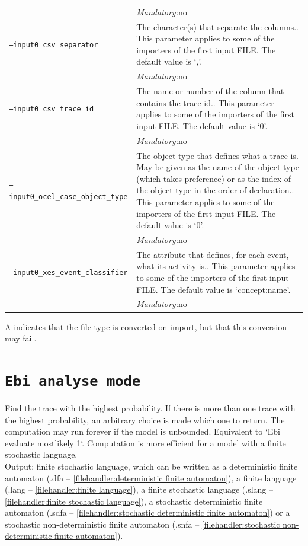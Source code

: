 {\begin{tabularx}{\linewidth}{lX}
&\textit{Mandatory:}\quad no\\
\texttt{--input0\_csv\_separator} & The character(s) that separate the columns.. This parameter applies to some of the importers of the first input FILE. The default value is `,'.\\
&\textit{Mandatory:}\quad no\\
\texttt{--input0\_csv\_trace\_id} & The name or number of the column that contains the trace id.. This parameter applies to some of the importers of the first input FILE. The default value is `0'.\\
&\textit{Mandatory:}\quad no\\
\texttt{--input0\_ocel\_case\_object\_type} & The object type that defines what a trace is. May be given as the name of the object type (which takes preference) or as the index of the object-type in the order of declaration.. This parameter applies to some of the importers of the first input FILE. The default value is `0'.\\
&\textit{Mandatory:}\quad no\\
\texttt{--input0\_xes\_event\_classifier} & The attribute that defines, for each event, what its activity is.. This parameter applies to some of the importers of the first input FILE. The default value is `concept:name'.\\
&\textit{Mandatory:}\quad no\\
\bottomrule
\end{tabularx}
A \textdagger{} indicates that the file type is converted on import, but that this conversion may fail.
\clearpage\section{\texttt{Ebi analyse mode}}
\label{command:Ebi analyse mode}
Find the trace with the highest probability.
If there is more than one trace with the highest probability, an arbitrary choice is made which one to return.
The computation may run forever if the model is unbounded.
Equivalent to `Ebi evaluate mostlikely 1`.
Computation is more efficient for a model with a finite stochastic language.\\
\noindent Output: finite stochastic language, which can be written as a deterministic finite automaton (.dfa -- \cref{filehandler:deterministic finite automaton}), a finite language (.lang -- \cref{filehandler:finite language}), a finite stochastic language (.slang -- \cref{filehandler:finite stochastic language}), a stochastic deterministic finite automaton (.sdfa -- \cref{filehandler:stochastic deterministic finite automaton}) or a stochastic non-deterministic finite automaton (.snfa -- \cref{filehandler:stochastic non-deterministic finite automaton}).\\
}
